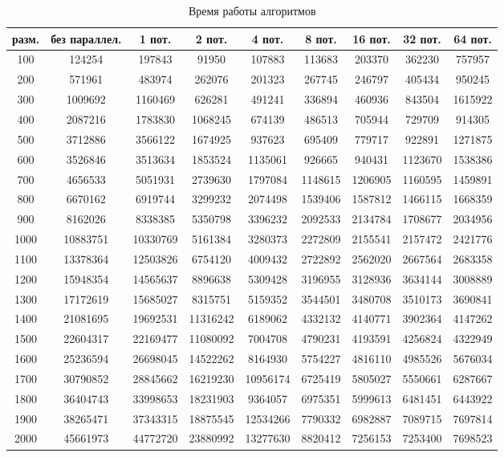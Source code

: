 \begin{table}[h!]
  \begin{center}
    \captionsetup{justification=raggedright}
    \caption{Время работы алгоритмов}
    \label{tab:workcost_classic}
    \begin{tabular}{c|c|c|c|c|c|c|c|c}
      \textbf{разм.} & \textbf{без параллел.} & \textbf{1 пот.}  & \textbf{2 пот.}  & \textbf{4 пот.}  & \textbf{8 пот.}  & \textbf{16 пот.}  & \textbf{32 пот.}  & \textbf{64 пот.}\\
      \hline
	100 & 124254 & 197843 & 91950 & 107883 & 113683 & 203370 & 362230 & 757957\\
	200 & 571961 & 483974 & 262076 & 201323 & 267745 & 246797 & 405434 & 950245\\
	300 & 1009692 & 1160469 & 626281 & 491241 & 336894 & 460936 & 843504 & 1615922\\
	400 & 2087216 & 1783830 & 1068245 & 674139 & 486513 & 705944 & 729709 & 914305\\
	500 & 3712886 & 3566122 & 1674925 & 937623 & 695409 & 779717 & 922891 & 1271875\\
	600 & 3526846 & 3513634 & 1853524 & 1135061 & 926665 & 940431 & 1123670 & 1538386\\
	700 & 4656533 & 5051931 & 2739630 & 1797084 & 1148615 & 1206905 & 1160595 & 1459891\\
	800 & 6670162 & 6919744 & 3299232 & 2074498 & 1539406 & 1587812 & 1466115 & 1668359\\
	900 & 8162026 & 8338385 & 5350798 & 3396232 & 2092533 & 2134784 & 1708677 & 2034956\\
	1000 & 10883751 & 10330769 & 5161384 & 3280373 & 2272809 & 2155541 & 2157472 & 2421776\\
	1100 & 13378364 & 12503826 & 6754120 & 4009432 & 2722892 & 2562020 & 2667564 & 2683358\\
	1200 & 15948354 & 14565637 & 8896638 & 5309428 & 3196955 & 3128936 & 3634144 & 3008889\\
	1300 & 17172619 & 15685027 & 8315751 & 5159352 & 3544501 & 3480708 & 3510173 & 3690841\\
	1400 & 21081695 & 19692531 & 11316242 & 6189062 & 4332132 & 4140771 & 3902364 & 4147262\\
	1500 & 22604317 & 22169477 & 11080092 & 7004708 & 4790231 & 4193591 & 4256824 & 4322949\\
	1600 & 25236594 & 26698045 & 14522262 & 8164930 & 5754227 & 4816110 & 4985526 & 5676034\\
	1700 & 30790852 & 28845662 & 16219230 & 10956174 & 6725419 & 5805027 & 5550661 & 6287667\\
	1800 & 36404743 & 33998653 & 18231903 & 9364057 & 6975351 & 5999613 & 6481451 & 6443922\\
	1900 & 38265471 & 37343315 & 18875545 & 12534266 & 7790332 & 6982887 & 7089715 & 7697814\\
	2000 & 45661973 & 44772720 & 23880992 & 13277630 & 8820412 & 7256153 & 7253400 & 7698523\\
    \end{tabular}
  \end{center}
\end{table}

